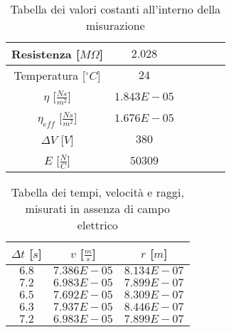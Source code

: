 \documentclass{article}
\begin{document}
\begin{multicols}{2}

\begin{table}[H]
	\centering
	\begin{tabular}{| c | c | c | c | c | c |}
		\hline
		Resistenza [$M\Omega$] & $2.028$\\
		\hline
		Temperatura [$^\circ C$]& $24$\\
		\hline
		$\eta$ [$\frac{Ns}{m^2}$] & $1.843E-05$\\
		\hline
		$\eta_{eff}$ [$\frac{Ns}{m^2}$] & $1.676E-05$\\
		\hline
		$\Delta V$ [$V$] & $380$\\
		\hline
		$E$ [$\frac N C$] & $50309$\\
		\hline
	\end{tabular}
	\caption{Tabella dei valori costanti all'interno della misurazione}
	\label{}
\end{table}

\columnbreak

\begin{table}[H]
	\centering
	\begin{tabular}{| c | c | c |}
		\hline
		$\Delta t$ [$s$] & $v$ [$\frac ms$] & $r$ [$m$] \\
		\hline
		$6.8$ & $7.386E-05$ & $8.134E-07$ \\
		$7.2$ & $6.983E-05$ & $7.899E-07$ \\
		$6.5$ & $7.692E-05$ & $8.309E-07$ \\
		$6.3$ & $7.937E-05$ & $8.446E-07$ \\
		$7.2$ & $6.983E-05$ & $7.899E-07$ \\
		\hline
	\end{tabular}
	\caption{Tabella dei tempi, velocità e raggi, misurati in assenza di campo elettrico}
	\label{}
\end{table}
	
\end{multicols}
\end{document}
